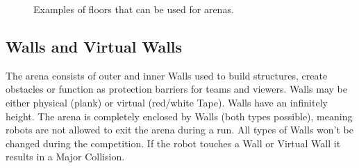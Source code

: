 \begin{figure} [h!]
\begin{center}
		 \hspace{0.1cm}
		 \hspace{0.1cm}
		 \hspace{0.1cm}
		 \hspace{0.1cm}
	\end{center}
	\caption{Examples of floors that can be used for \RCAW arenas.}
	\label{fig:example_floors}
\end{figure}





\subsection{Walls and Virtual Walls}
\label{subsec: Walls and virtual Walls}

The arena consists of outer and inner Walls used to build structures, create obstacles or function as protection barriers for teams and viewers. Walls may be either physical (plank) or virtual (red/white Tape). Walls have an infinitely height.
The arena is completely enclosed by Walls (both types possible), meaning robots are not allowed to exit the arena during a run. All types of Walls won't be changed during the competition. If the robot touches a Wall or Virtual Wall it results in a Major Collision.

